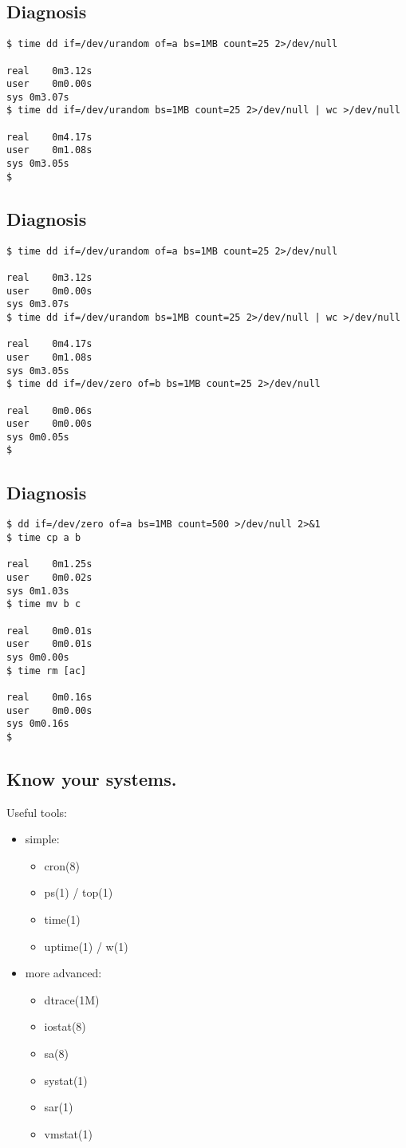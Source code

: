 \documentclass[xga]{xdvislides}
\begin{document}
\subsection{Diagnosis}
\begin{verbatim}
$ time dd if=/dev/urandom of=a bs=1MB count=25 2>/dev/null

real	0m3.12s
user	0m0.00s
sys	0m3.07s
$ time dd if=/dev/urandom bs=1MB count=25 2>/dev/null | wc >/dev/null

real	0m4.17s
user	0m1.08s
sys	0m3.05s
$
\end{verbatim}

\subsection{Diagnosis}
\begin{verbatim}
$ time dd if=/dev/urandom of=a bs=1MB count=25 2>/dev/null

real	0m3.12s
user	0m0.00s
sys	0m3.07s
$ time dd if=/dev/urandom bs=1MB count=25 2>/dev/null | wc >/dev/null

real	0m4.17s
user	0m1.08s
sys	0m3.05s
$ time dd if=/dev/zero of=b bs=1MB count=25 2>/dev/null

real	0m0.06s
user	0m0.00s
sys	0m0.05s
$
\end{verbatim}


\subsection{Diagnosis}
\begin{verbatim}
$ dd if=/dev/zero of=a bs=1MB count=500 >/dev/null 2>&1
$ time cp a b

real	0m1.25s
user	0m0.02s
sys	0m1.03s
$ time mv b c

real	0m0.01s
user	0m0.01s
sys	0m0.00s
$ time rm [ac]

real	0m0.16s
user	0m0.00s
sys	0m0.16s
$
\end{verbatim}

\subsection{Know your systems.}
Useful tools:
\begin{itemize}
	\item simple:
		\begin{itemize}
			\item cron(8)
			\item ps(1) / top(1)
			\item time(1)
			\item uptime(1) / w(1)
		\end{itemize}
	\item more advanced:
		\begin{itemize}
			\item dtrace(1M)
			\item iostat(8)
			\item sa(8)
			\item systat(1)
			\item sar(1)
			\item vmstat(1)
		\end{itemize}
\end{itemize}
\end{document}
